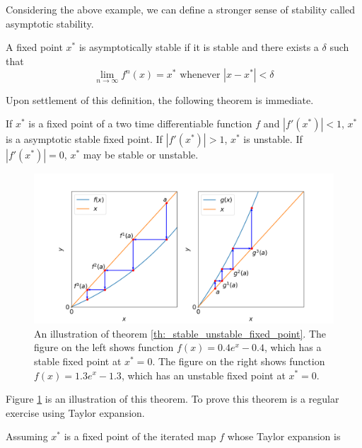 Considering the above example, we can define a stronger sense of stability called asymptotic stability.

\begin{defn}
	A fixed point $x^*$ is asymptotically stable if it is stable and there exists a $\delta$ such that 
	$$
		\lim_{n \rightarrow \infty} f^n(x) = x^* \text{ whenever } |x - x^*| < \delta
	$$
\end{defn}

Upon settlement of this definition, the following theorem is immediate.

\begin{thm}\label{th:_stable_unstable_fixed_point}
	If $x^*$ is a fixed point of a two time differentiable function $f$ and $|f'(x^*)| < 1$, $x^*$ is a  asymptotic stable fixed point.
	If $|f'(x^*)| > 1$, $x^*$ is unstable.
	If $|f'(x^*)| = 0$, $x^*$ may be stable or unstable.
\end{thm}

\begin{figure}
	\centering
	\includegraphics[width=\textwidth]{./figures/stable_and_unstable_fixed_point.png}
	\caption{An illustration of theorem \ref{th:_stable_unstable_fixed_point}.
	The figure on the left shows function $f(x) = 0.4 e^x - 0.4$, which has a stable fixed point at $x^* = 0$. 
	The figure on the right shows function $f(x) = 1.3 e^x - 1.3$, which has an unstable fixed point at $x^* = 0$.}
	\label{fig:stable and unstable fixed point}
\end{figure}

Figure \ref{fig:stable and unstable fixed point} is an illustration of this theorem.
To prove this theorem is a regular exercise using Taylor expansion. 

Assuming $x^*$ is a fixed point of the iterated map $f$ whose Taylor expansion is


